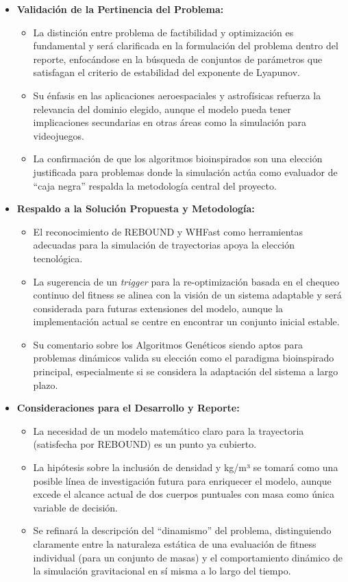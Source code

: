\begin{itemize}
    \item \textbf{Validación de la Pertinencia del Problema:}
    \begin{itemize}
        \item La distinción entre problema de factibilidad y optimización es fundamental y será clarificada en la formulación del problema dentro del reporte, enfocándose en la búsqueda de conjuntos de parámetros que satisfagan el criterio de estabilidad del exponente de Lyapunov.
        \item Su énfasis en las aplicaciones aeroespaciales y astrofísicas refuerza la relevancia del dominio elegido, aunque el modelo pueda tener implicaciones secundarias en otras áreas como la simulación para videojuegos.
        \item La confirmación de que los algoritmos bioinspirados son una elección justificada para problemas donde la simulación actúa como evaluador de ``caja negra'' respalda la metodología central del proyecto.
    \end{itemize}

    \item \textbf{Respaldo a la Solución Propuesta y Metodología:}
    \begin{itemize}
        \item El reconocimiento de REBOUND y WHFast como herramientas adecuadas para la simulación de trayectorias apoya la elección tecnológica.
        \item La sugerencia de un \textit{trigger} para la re-optimización basada en el chequeo continuo del fitness se alinea con la visión de un sistema adaptable y será considerada para futuras extensiones del modelo, aunque la implementación actual se centre en encontrar un conjunto inicial estable.
        \item Su comentario sobre los Algoritmos Genéticos siendo aptos para problemas dinámicos valida su elección como el paradigma bioinspirado principal, especialmente si se considera la adaptación del sistema a largo plazo.
    \end{itemize}

    \item \textbf{Consideraciones para el Desarrollo y Reporte:}
    \begin{itemize}
        \item La necesidad de un modelo matemático claro para la trayectoria (satisfecha por REBOUND) es un punto ya cubierto.
        \item La hipótesis sobre la inclusión de densidad y kg/m³ se tomará como una posible línea de investigación futura para enriquecer el modelo, aunque excede el alcance actual de dos cuerpos puntuales con masa como única variable de decisión.
        \item Se refinará la descripción del ``dinamismo'' del problema, distinguiendo claramente entre la naturaleza estática de una evaluación de fitness individual (para un conjunto de masas) y el comportamiento dinámico de la simulación gravitacional en sí misma a lo largo del tiempo.
    \end{itemize}
\end{itemize}

